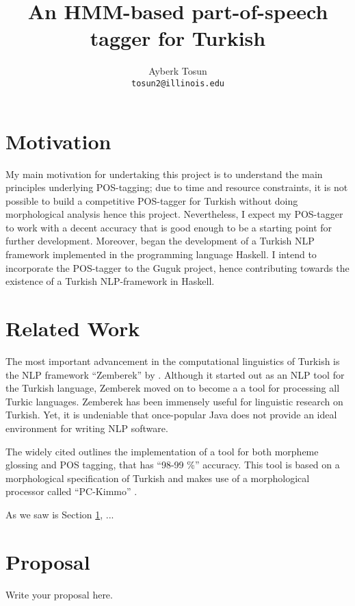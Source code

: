 \documentclass{article}
\title{\bf An HMM-based part-of-speech tagger for Turkish}
\author{Ayberk Tosun\\\texttt{tosun2@illinois.edu}}
\date{}
\begin{document}
\maketitle

\section{Motivation}
\label{sec:motivation}
My main motivation for undertaking this project is to understand the main
principles underlying POS-tagging; due to time and resource constraints, it is
not possible to build a competitive POS-tagger for Turkish without doing
morphological analysis hence this project. Nevertheless, I expect my POS-tagger
to work with a decent accuracy that is good enough to be a starting point for
further development. Moreover, \citet{Korkut2015} began the development of a
Turkish NLP framework implemented in the programming language Haskell. I intend
to incorporate the POS-tagger to the Guguk project, hence contributing towards
the existence of a Turkish NLP-framework in Haskell.

\section{Related Work}

The most important advancement in the computational linguistics of Turkish is
the NLP framework ``Zemberek'' by \citet{akin2007zemberek}. Although it started
out as an NLP tool for the Turkish language, Zemberek moved on to become a
a tool for processing all Turkic languages. Zemberek has been immensely useful
for linguistic research on Turkish. Yet, it is undeniable that once-popular
Java does not provide an ideal environment for writing NLP software.

The widely cited \citet{oflazer1994tagging} outlines the implementation of a
tool for both morpheme glossing and POS tagging, that has ``98-99 \%'' accuracy. This
tool is based on a morphological specification of Turkish and makes use of a
morphological processor called ``PC-Kimmo'' \citep{antworth1991pc}.

As we saw is Section \ref{sec:motivation}, ...
%
%

\section{Proposal}

Write your proposal here.




\end{document}
